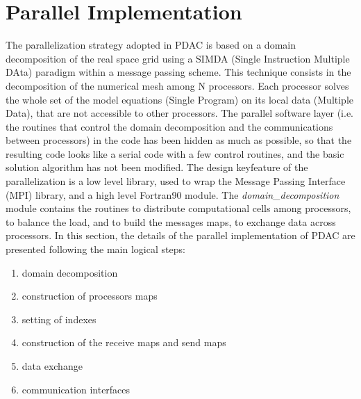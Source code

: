 \section{Parallel Implementation}
%
The parallelization strategy adopted in PDAC is based on a domain decomposition
of the real space grid using a SIMDA (Single Instruction Multiple DAta) paradigm
within a message passing scheme. This technique consists in the decomposition
of the numerical mesh among N processors. Each processor solves the whole set of
the model equations (Single Program) on its local data (Multiple Data),
that are not accessible to other processors.
%
The parallel software layer (i.e. the routines that control the domain 
decomposition and the communications between processors) in the code has 
been hidden as much as possible, so that the resulting code
looks like a serial code with a few control routines, and the basic 
solution algorithm has not been modified.
The design keyfeature of the parallelization is a low level library, 
used to wrap the Message Passing Interface (MPI) library, and a high level 
Fortran90 module. The {\em domain\_decomposition} module contains the routines 
to distribute computational cells among processors, to balance the load, and 
to build the messages maps, to exchange data across processors.  
In this section, the details of the parallel implementation of PDAC are
presented following the main logical steps:
\begin{enumerate}
\item domain decomposition
\item construction of processors maps
\item setting of indexes
\item construction of the receive maps and send maps
\item data exchange
\item communication interfaces
\end{enumerate}
% 
